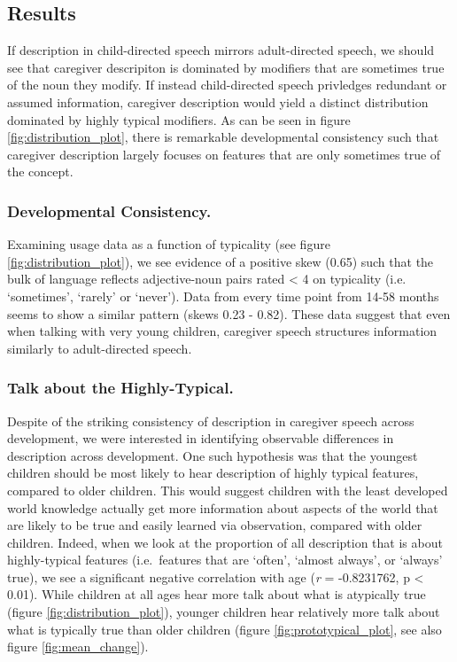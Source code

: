 \documentclass[10pt, letterpaper]{article}
\begin{document}
\hypertarget{results}{%
\subsection{Results}\label{results}}

If description in child-directed speech mirrors adult-directed speech,
we should see that caregiver descripiton is dominated by modifiers that
are sometimes true of the noun they modify. If instead child-directed
speech privledges redundant or assumed information, caregiver
description would yield a distinct distribution dominated by highly
typical modifiers. As can be seen in figure \ref{fig:distribution_plot},
there is remarkable developmental consistency such that caregiver
description largely focuses on features that are only sometimes true of
the concept.

\hypertarget{developmental-consistency.}{%
\subsubsection{Developmental
Consistency.}\label{developmental-consistency.}}

Examining usage data as a function of typicality (see figure
\ref{fig:distribution_plot}), we see evidence of a positive skew (0.65)
such that the bulk of language reflects adjective-noun pairs rated
\textless{} 4 on typicality (i.e. `sometimes', `rarely' or `never').
Data from every time point from 14-58 months seems to show a similar
pattern (skews 0.23 - 0.82). These data suggest that even when talking
with very young children, caregiver speech structures information
similarly to adult-directed speech.

\hypertarget{talk-about-the-highly-typical.}{%
\subsubsection{Talk about the
Highly-Typical.}\label{talk-about-the-highly-typical.}}

Despite of the striking consistency of description in caregiver speech
across development, we were interested in identifying observable
differences in description across development. One such hypothesis was
that the youngest children should be most likely to hear description of
highly typical features, compared to older children. This would suggest
children with the least developed world knowledge actually get more
information about aspects of the world that are likely to be true and
easily learned via observation, compared with older children. Indeed,
when we look at the proportion of all description that is about
highly-typical features (i.e.~features that are `often', `almost
always', or `always' true), we see a significant negative correlation
with age (\emph{r} = -0.8231762, p \textless{} 0.01). While children at
all ages hear more talk about what is atypically true (figure
\ref{fig:distribution_plot}), younger children hear relatively more talk
about what is typically true than older children (figure
\ref{fig:prototypical_plot}, see also figure \ref{fig:mean_change}).
\end{document}
